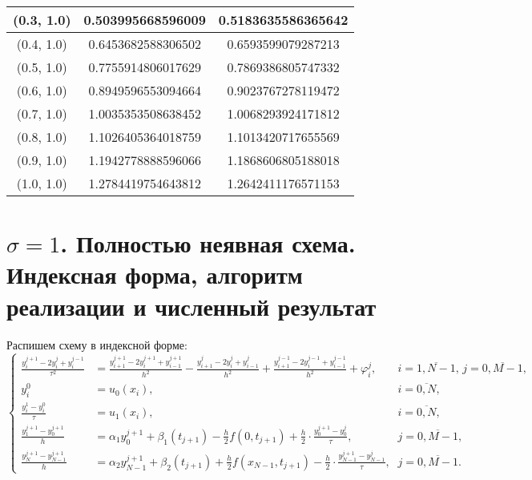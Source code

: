 \begin{table}[H]
\begin{tabular}{|c|c|c|}
\hline
(0.3, 1.0) & 0.503995668596009 & 0.5183635586365642 \\
\hline
(0.4, 1.0) & 0.6453682588306502 & 0.6593599079287213 \\
\hline
(0.5, 1.0) & 0.7755914806017629 & 0.7869386805747332 \\
\hline
(0.6, 1.0) & 0.8949596553094664 & 0.9023767278119472 \\
\hline
(0.7, 1.0) & 1.0035353508638452 & 1.0068293924171812 \\
\hline
(0.8, 1.0) & 1.1026405364018759 & 1.1013420717655569 \\
\hline
(0.9, 1.0) & 1.1942778888596066 & 1.1868606805188018 \\
\hline
(1.0, 1.0) & 1.2784419754643812 & 1.2642411176571153 \\
\hline
\end{tabular}
\end{table}
\normalsize

\section{$\sigma=1$. Полностью неявная схема. Индексная форма, алгоритм реализации и численный результат}
Распишем схему в индексной форме:
\begin{equation}
\left\{
\begin{array}{lll}
\frac{y_{i}^{j+1}-2y_{i}^{j}+y_{i}^{j-1}}{\tau^{2}} & =\frac{y_{i+1}^{j+1}-2y_{i}^{j+1}+y_{i-1}^{j+1}}{h^{2}}-\frac{y_{i+1}^{j}-2y_{i}^{j}+y_{i-1}^{j}}{h^{2}}+\frac{y_{i+1}^{j-1}-2y_{i}^{j-1}+y_{i-1}^{j-1}}{h^{2}} + \varphi_{i}^{j}\text{,} & i=\overline{1,N-1}\text{, } j=\overline{0,M-1}\text{,}\\
y_{i}^{0} & = u_{0}(x_{i})\text{,} & i=\overline{0,N}\text{,} \\
\frac{y_{i}^{1}-y_{i}^{0}}{\tau} & = u_{1}(x_{i})\text{,} & i=\overline{0,N}\text{,} \\
\frac{y_{1}^{j+1}-y_{0}^{j+1}}{h} & = \alpha_{1}y_{0}^{j+1} + \beta_{1}(t_{j+1}) - \frac{h}{2}f(0,t_{j+1}) + \frac{h}{2}\cdot\frac{y_{0}^{j+1}-y_{0}^{j}}{\tau}\text{,} & j=\overline{0,M-1}\text{,}\\
\frac{y_{N}^{j+1}-y_{N-1}^{j+1}}{h} & = \alpha_{2}y_{N-1}^{j+1} + \beta_{2}(t_{j+1}) + \frac{h}{2}f(x_{N-1},t_{j+1}) - \frac{h}{2}\cdot\frac{y_{N-1}^{j+1}-y_{N-1}^{j}}{\tau}\text{,} & j=\overline{0,M-1}\text{.}
\end{array}
\right.
\end{equation} \par


